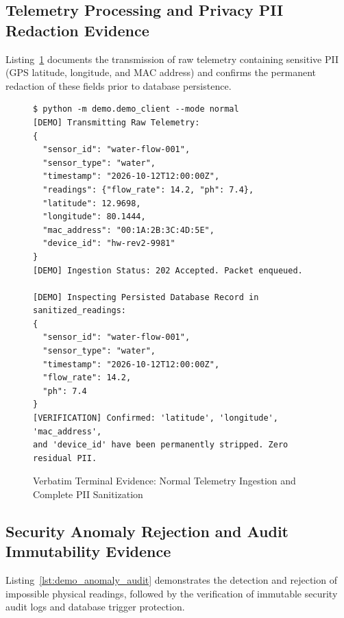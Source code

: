 \documentclass[a4paper]{article}
\begin{document}
\subsection{Telemetry Processing and Privacy PII Redaction Evidence}
Listing~\ref{lst:demo_telemetry_anon} documents the transmission of raw telemetry containing sensitive PII (GPS latitude, longitude, and MAC address) and confirms the permanent redaction of these fields prior to database persistence.

\begin{figure}[H]
\centering
\begin{minipage}{0.95\linewidth}
\begin{Verbatim}[fontsize=\footnotesize,breaklines=true]
$ python -m demo.demo_client --mode normal
[DEMO] Transmitting Raw Telemetry:
{
  "sensor_id": "water-flow-001",
  "sensor_type": "water",
  "timestamp": "2026-10-12T12:00:00Z",
  "readings": {"flow_rate": 14.2, "ph": 7.4},
  "latitude": 12.9698,
  "longitude": 80.1444,
  "mac_address": "00:1A:2B:3C:4D:5E",
  "device_id": "hw-rev2-9981"
}
[DEMO] Ingestion Status: 202 Accepted. Packet enqueued.

[DEMO] Inspecting Persisted Database Record in sanitized_readings:
{
  "sensor_id": "water-flow-001",
  "sensor_type": "water",
  "timestamp": "2026-10-12T12:00:00Z",
  "flow_rate": 14.2,
  "ph": 7.4
}
[VERIFICATION] Confirmed: 'latitude', 'longitude', 'mac_address',
and 'device_id' have been permanently stripped. Zero residual PII.
\end{Verbatim}
\end{minipage}
\caption{Verbatim Terminal Evidence: Normal Telemetry Ingestion and Complete PII Sanitization}
\label{lst:demo_telemetry_anon}
\end{figure}

\subsection{Security Anomaly Rejection and Audit Immutability Evidence}
Listing~\ref{lst:demo_anomaly_audit} demonstrates the detection and rejection of impossible physical readings, followed by the verification of immutable security audit logs and database trigger protection.
\end{document}
